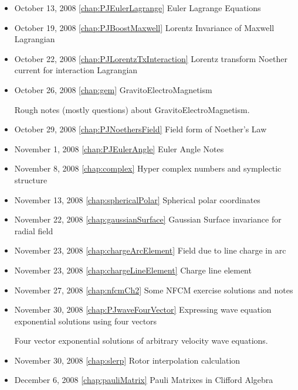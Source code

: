 \begin{itemize}
\item October 13, 2008 \ref{chap:PJEulerLagrange} Euler Lagrange Equations

\item October 19, 2008 \ref{chap:PJBoostMaxwell} Lorentz Invariance of Maxwell Lagrangian

\item October 22, 2008 \ref{chap:PJLorentzTxInteraction} Lorentz transform Noether current for interaction Lagrangian

\item October 26, 2008 \ref{chap:gem} GravitoElectroMagnetism

Rough notes (mostly questions) about GravitoElectroMagnetism.\item October 29, 2008 \ref{chap:PJNoethersField} Field form of Noether's Law

\item November 1, 2008 \ref{chap:PJEulerAngle} Euler Angle Notes

\item November 8, 2008 \ref{chap:complex} Hyper complex numbers and symplectic structure

\item November 13, 2008 \ref{chap:sphericalPolar} Spherical polar coordinates

\item November 22, 2008 \ref{chap:gaussianSurface} Gaussian Surface invariance for radial field

\item November 23, 2008 \ref{chap:chargeArcElement} Field due to line charge in arc

\item November 23, 2008 \ref{chap:chargeLineElement} Charge line element

\item November 27, 2008 \ref{chap:nfcmCh2} Some NFCM exercise solutions and notes

\item November 30, 2008 \ref{chap:PJwaveFourVector} Expressing wave equation exponential solutions using four vectors

Four vector exponential solutions of arbitrary velocity wave equations.\item November 30, 2008 \ref{chap:slerp} Rotor interpolation calculation

\item December 6, 2008 \ref{chap:pauliMatrix} Pauli Matrixes in Clifford Algebra


\end{itemize}
